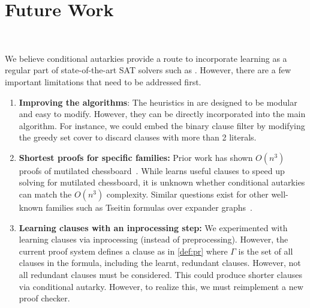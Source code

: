 \section{Future Work}~\label{sec:futurework}


We believe conditional autarkies provide a route to incorporate \pr learning
as a regular part of state-of-the-art SAT solvers such as \cadical. However,
there are a few important limitations that need to be addressed first.

\begin{enumerate}
    \item \textbf{Improving the algorithms}: The heuristics in \tool are
    designed to be modular and easy to modify. However, they can
    be directly incorporated into the main algorithm. For instance, we could embed the
    binary clause filter by modifying the greedy set cover to discard clauses
    with more than 2 literals.
    \item \textbf{Shortest proofs for specific families:} Prior work has shown
    $O(n^3)$ \pr proofs of mutilated chessboard~\cite{mutilatedchessboard-pr}.
    While \tool learns useful clauses to speed up solving for
    mutilated chessboard, it is unknown whether conditional autarkies can match
    the $O(n^3)$ complexity. Similar questions exist for other well-known
    families such as Tseitin formulas over expander
    graphs~\cite{er,hardexamplesresolution}.
    \item \textbf{Learning \pr clauses with an inprocessing step:} We
    experimented with learning \pr clauses via inprocessing (instead of
    preprocessing). However, the current \pr proof system defines a \pr clause
    as in \autoref{def:pr} where $\Gamma$ is the set of all clauses in the
    formula, including the learnt, redundant clauses. However, not all redundant clauses 
    must be considered. This could produce shorter clauses via conditional autarky.
    However, to realize this, we must reimplement a new \pr proof checker.

    
\end{enumerate}